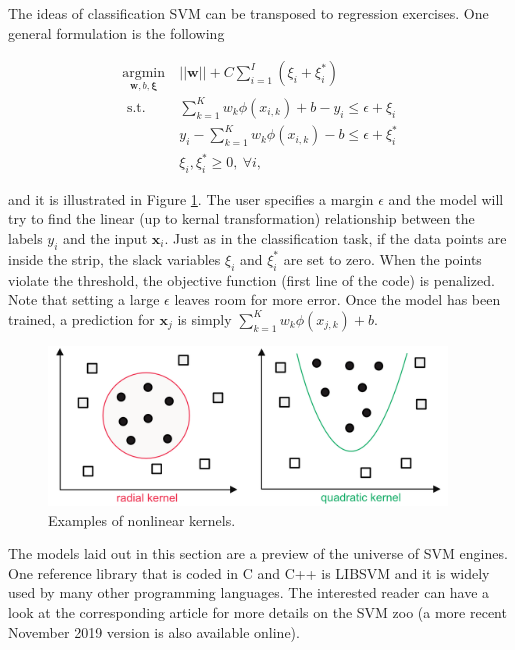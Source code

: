 \documentclass[]{krantz}
\theoremstyle{definition}
\theoremstyle{definition}
\theoremstyle{definition}
\theoremstyle{remark}
\begin{document}
The ideas of classification SVM can be transposed to regression
exercises. One general formulation is the following

\begin{align}
\underset{\textbf{w},b, \boldsymbol{\xi}}{\text{argmin}} \  & ||\textbf{w}||+C\sum_{i=1}^I\left(\xi_i+\xi_i^* \right)\\
 \text{ s.t. }&  \sum_{k=1}^Kw_k\phi(x_{i,k})+b -y_i\le \epsilon+\xi_i \\ \label{eq:svm4}
&  y_i-\sum_{k=1}^Kw_k\phi(x_{i,k})-b \le \epsilon+\xi_i^* \\
&\xi_i,\xi_i^*\ge 0, \ \forall i  ,
\end{align}

and it is illustrated in Figure \ref{fig:svmscheme4}. The user specifies
a margin \(\epsilon\) and the model will try to find the linear (up to
kernal transformation) relationship between the labels \(y_i\) and the
input \(\textbf{x}_i\). Just as in the classification task, if the data
points are inside the strip, the slack variables \(\xi_i\) and
\(\xi_i^*\) are set to zero. When the points violate the threshold, the
objective function (first line of the code) is penalized. Note that
setting a large \(\epsilon\) leaves room for more error. Once the model
has been trained, a prediction for \(\textbf{x}_j\) is simply
\(\sum_{k=1}^Kw_k\phi(x_{j,k})+b\).

\begin{figure}[H]

{\centering \includegraphics[width=400px]{images/kernel} 

}

\caption{Examples of nonlinear kernels.}\label{fig:svmscheme4}
\end{figure}

The models laid out in this section are a preview of the universe of SVM
engines. One reference library that is coded in C and C++ is LIBSVM and
it is widely used by many other programming languages. The interested
reader can have a look at the corresponding article
\citet{chang2011libsvm} for more details on the SVM zoo (a more recent
November 2019 version is also available online).
\end{document}
